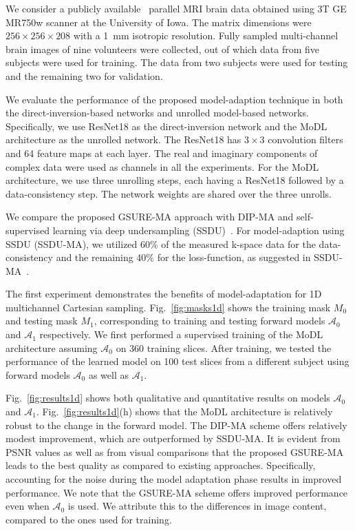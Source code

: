 \documentclass{article}
\begin{document}
We consider a publicly available~\cite{modl} parallel MRI brain data obtained using 3T GE MR750w scanner  at the University of Iowa. The matrix dimensions were $256\times256\times208$ with a 1~mm isotropic resolution. Fully sampled multi-channel brain images of nine volunteers were collected, out of which data from five subjects were used for training. The data from two subjects were used for testing and the remaining two for validation. 


We evaluate the performance of the proposed model-adaption technique in both the direct-inversion-based networks and unrolled model-based networks. Specifically, we use ResNet18 as the direct-inversion network and the MoDL architecture as the unrolled network. The ResNet18 has $3\times3$ convolution filters and 64 feature maps at each layer. The real and imaginary components of complex data were used as channels in all the experiments. For the MoDL architecture, we use three unrolling steps, each having a ResNet18 followed by a data-consistency step. The network weights are shared over the three unrolls. 


We compare the proposed GSURE-MA approach with DIP-MA and self-supervised learning via deep undersampling (SSDU)~\cite{ssduft}. For model-adaption using SSDU (SSDU-MA), we utilized 60\% of the measured k-space data for the data-consistency and the remaining 40\% for the loss-function, as suggested in SSDU-MA~\cite{ssduft}.  

The first experiment demonstrates the benefits of model-adaptation for 1D multichannel Cartesian sampling. Fig.~\ref{fig:masks1d} shows the training mask $M_0$ and testing mask $M_1$, corresponding to training and testing forward models $\mathcal A_0$ and  $\mathcal A_1$ respectively.  We first performed a  supervised training of the MoDL architecture assuming $\mathcal A_0$ on 360 training slices. After training, we tested the performance of the learned model on 100 test slices from a different subject using forward models $\mathcal A_0$ as well as $\mathcal A_1$. 

Fig.~\ref{fig:results1d} shows both qualitative and quantitative results on models $\mathcal A_0$ and $\mathcal A_1$. 
Fig.~\ref{fig:results1d}(h) shows that the MoDL architecture is relatively robust to the change in the forward model. The DIP-MA scheme offers relatively modest improvement, which are outperformed by SSDU-MA. It is evident from PSNR values as well as from visual comparisons that the proposed GSURE-MA leads to the best quality as compared to existing approaches. Specifically, accounting for the noise during the model adaptation phase results in improved performance. We note that the GSURE-MA scheme offers improved performance even when $\mathcal A_0$ is used. We attribute this to the differences in image content, compared to the ones used for training. 
\end{document}
